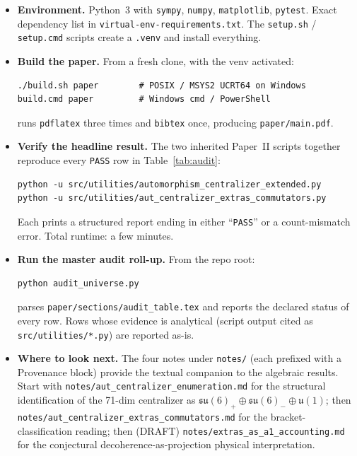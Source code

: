 \label{sec:reproducibility}

\begin{itemize}
\item \textbf{Environment.}  Python~3 with \texttt{sympy},
      \texttt{numpy}, \texttt{matplotlib}, \texttt{pytest}.
      Exact dependency list in \texttt{virtual-env-requirements.txt}.
      The \texttt{setup.sh} / \texttt{setup.cmd} scripts create a
      \texttt{.venv} and install everything.

\item \textbf{Build the paper.}  From a fresh clone, with the venv
      activated:
      \begin{verbatim}
./build.sh paper        # POSIX / MSYS2 UCRT64 on Windows
build.cmd paper         # Windows cmd / PowerShell
      \end{verbatim}
      runs \texttt{pdflatex} three times and \texttt{bibtex} once,
      producing \texttt{paper/main.pdf}.

\item \textbf{Verify the headline result.}  The two inherited
      Paper~II scripts together reproduce every \texttt{PASS} row
      in Table~\ref{tab:audit}:
      \begin{verbatim}
python -u src/utilities/automorphism_centralizer_extended.py
python -u src/utilities/aut_centralizer_extras_commutators.py
      \end{verbatim}
      Each prints a structured report ending in either ``\texttt{PASS}''
      or a count-mismatch error.  Total runtime: a few minutes.

\item \textbf{Run the master audit roll-up.}  From the repo root:
      \begin{verbatim}
python audit_universe.py
      \end{verbatim}
      parses \texttt{paper/sections/audit\_table.tex} and reports
      the declared status of every row.  Rows whose evidence is
      analytical (script output cited as
      \texttt{src/utilities/*.py}) are reported as-is.

\item \textbf{Where to look next.}  The four notes under
      \texttt{notes/} (each prefixed with a Provenance block)
      provide the textual companion to the algebraic results.
      Start with \texttt{notes/aut\_centralizer\_enumeration.md}
      for the structural identification of the 71-dim centralizer
      as $\mathfrak{su}(6)_+ \oplus \mathfrak{su}(6)_- \oplus
      \mathfrak{u}(1)$; then
      \texttt{notes/aut\_centralizer\_extras\_commutators.md}
      for the bracket-classification reading; then (DRAFT)
      \texttt{notes/extras\_as\_a1\_accounting.md} for the
      conjectural decoherence-as-projection physical
      interpretation.
\end{itemize}
